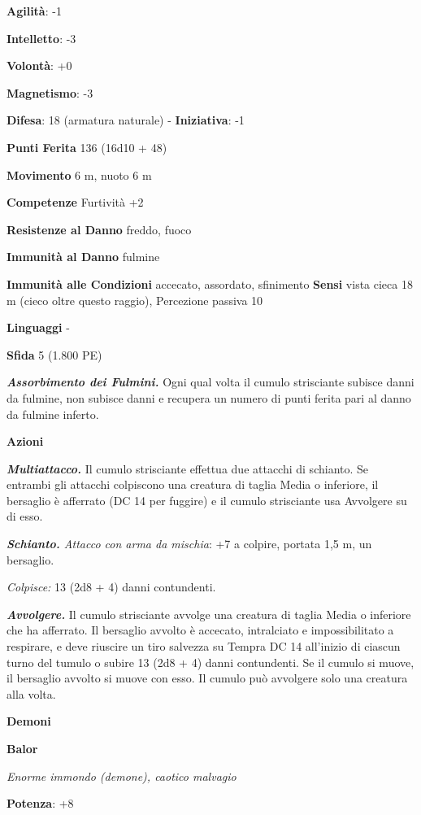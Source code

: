 \begin{multicols}{2}
\textbf{Agilità}: -1

\textbf{Intelletto}: -3

\textbf{Volontà}: +0

\textbf{Magnetismo}: -3

\textbf{Difesa}: 18 (armatura naturale) - \textbf{Iniziativa}: -1

\textbf{Punti Ferita} 136 (16d10 + 48)

\textbf{Movimento} 6 m, nuoto 6 m

\textbf{Competenze} Furtività +2

\textbf{Resistenze al Danno} freddo, fuoco

\textbf{Immunità al Danno} fulmine

\textbf{Immunità alle Condizioni} accecato, assordato, sfinimento
\textbf{Sensi} vista cieca 18 m (cieco oltre questo raggio), Percezione
passiva 10

\textbf{Linguaggi} -

\textbf{Sfida} 5 (1.800 PE)

\emph{\textbf{Assorbimento dei Fulmini.}} Ogni qual volta il cumulo
strisciante subisce danni da fulmine, non subisce danni e recupera un
numero di punti ferita pari al danno da fulmine inferto.

\textbf{Azioni}

\emph{\textbf{Multiattacco.}} Il cumulo strisciante effettua due
attacchi di schianto. Se entrambi gli attacchi colpiscono una creatura
di taglia Media o inferiore, il bersaglio è afferrato (DC 14 per
fuggire) e il cumulo strisciante usa Avvolgere su di esso.

\emph{\textbf{Schianto.} Attacco con arma da mischia}: +7 a colpire,
portata 1,5 m, un bersaglio.

\emph{Colpisce:} 13 (2d8 + 4) danni contundenti.

\emph{\textbf{Avvolgere.}} Il cumulo strisciante avvolge una creatura di
taglia Media o inferiore che ha afferrato. Il bersaglio avvolto è
accecato, intralciato e impossibilitato a respirare, e deve riuscire un
tiro salvezza su Tempra DC 14 all'inizio di ciascun turno del
tumulo o subire 13 (2d8 + 4) danni contundenti. Se il cumulo si muove,
il bersaglio avvolto si muove con esso. Il cumulo può avvolgere solo una
creatura alla volta.

\textbf{Demoni}

\textbf{Balor}

\emph{Enorme immondo (demone), caotico malvagio}

\textbf{Potenza}: +8


\end{multicols}
